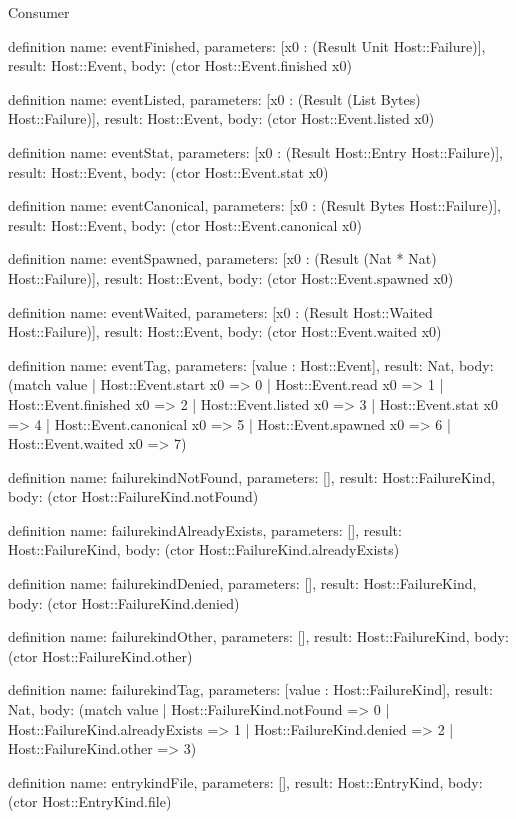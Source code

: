 \begin{lexlean}{Consumer}
\begin{semanticmodule}
definition{
  name: eventFinished,
  parameters: [x0 : (Result Unit Host::Failure)],
  result: Host::Event,
  body: (ctor Host::Event.finished x0)
}

definition{
  name: eventListed,
  parameters: [x0 : (Result (List Bytes) Host::Failure)],
  result: Host::Event,
  body: (ctor Host::Event.listed x0)
}

definition{
  name: eventStat,
  parameters: [x0 : (Result Host::Entry Host::Failure)],
  result: Host::Event,
  body: (ctor Host::Event.stat x0)
}

definition{
  name: eventCanonical,
  parameters: [x0 : (Result Bytes Host::Failure)],
  result: Host::Event,
  body: (ctor Host::Event.canonical x0)
}

definition{
  name: eventSpawned,
  parameters: [x0 : (Result (Nat * Nat) Host::Failure)],
  result: Host::Event,
  body: (ctor Host::Event.spawned x0)
}

definition{
  name: eventWaited,
  parameters: [x0 : (Result Host::Waited Host::Failure)],
  result: Host::Event,
  body: (ctor Host::Event.waited x0)
}

definition{
  name: eventTag,
  parameters: [value : Host::Event],
  result: Nat,
  body: (match value
    | Host::Event.start x0 => 0
    | Host::Event.read x0 => 1
    | Host::Event.finished x0 => 2
    | Host::Event.listed x0 => 3
    | Host::Event.stat x0 => 4
    | Host::Event.canonical x0 => 5
    | Host::Event.spawned x0 => 6
    | Host::Event.waited x0 => 7)
}

definition{
  name: failurekindNotFound,
  parameters: [],
  result: Host::FailureKind,
  body: (ctor Host::FailureKind.notFound)
}

definition{
  name: failurekindAlreadyExists,
  parameters: [],
  result: Host::FailureKind,
  body: (ctor Host::FailureKind.alreadyExists)
}

definition{
  name: failurekindDenied,
  parameters: [],
  result: Host::FailureKind,
  body: (ctor Host::FailureKind.denied)
}

definition{
  name: failurekindOther,
  parameters: [],
  result: Host::FailureKind,
  body: (ctor Host::FailureKind.other)
}

definition{
  name: failurekindTag,
  parameters: [value : Host::FailureKind],
  result: Nat,
  body: (match value
    | Host::FailureKind.notFound => 0
    | Host::FailureKind.alreadyExists => 1
    | Host::FailureKind.denied => 2
    | Host::FailureKind.other => 3)
}

definition{
  name: entrykindFile,
  parameters: [],
  result: Host::EntryKind,
  body: (ctor Host::EntryKind.file)
}


\end{semanticmodule}
\end{lexlean}
